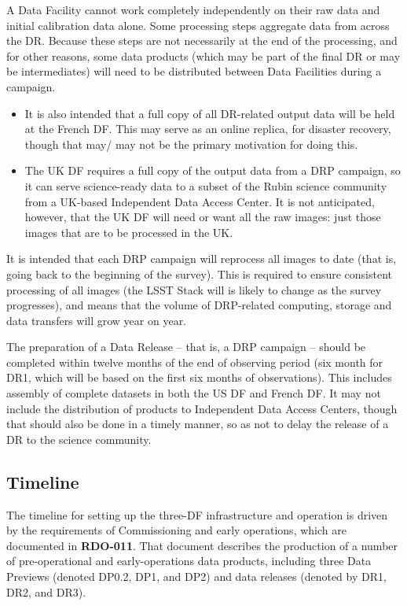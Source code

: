 A Data Facility cannot work completely independently on their raw data and initial calibration data alone. Some processing steps aggregate data from across the DR. Because these steps are not necessarily at the end of the processing, and for other reasons, some data products (which may be part of the final DR or may be intermediates) will need to be distributed between Data Facilities during a campaign.

\begin{itemize}

  \item It is also intended that a full copy of all DR-related output data will be held at the French DF. This may serve as an online replica, for disaster recovery, though that may/ may not be the primary motivation for doing this.

  \item The UK DF requires a full copy of the output data from a DRP campaign, so it can serve science-ready data to a subset of the Rubin science community from a UK-based Independent Data Access Center. It is not anticipated, however, that the UK DF will need or want all the raw images: just those images that are to be processed in the UK.
    
\end{itemize}

It is intended that each DRP campaign will reprocess all images to
date (that is, going back to the beginning of the survey). This is
required to ensure consistent processing of all images (the LSST Stack
will is likely to change as the survey progresses), and means that the
volume of DRP-related computing, storage and data transfers will grow
year on year.

The preparation of a Data Release – that is, a DRP campaign – should be completed within twelve months of the end of observing period (six month for DR1, which will be based on the first six months of observations). This includes assembly of complete datasets in both the US DF and French DF. It may not include the distribution of products to Independent Data Access Centers, though that should also be done in a timely manner, so as not to delay the release of a DR to the science community.

\subsection{Timeline}

The timeline for setting up the three-DF infrastructure and operation
is driven by the requirements of Commissioning and early operations,
which are documented in {\bf RDO-011}. That document describes the
production of a number of pre-operational and early-operations data
products, including three Data Previews (denoted DP0.2, DP1, and DP2)
and data releases (denoted by DR1, DR2, and DR3).

